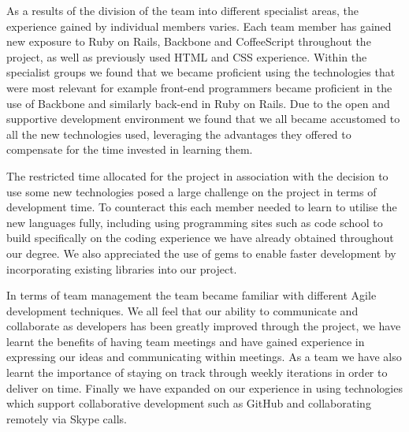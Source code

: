 		As a results of the division of the team into different specialist areas, the experience gained by individual members varies. Each team member has gained new exposure to Ruby on Rails, Backbone and CoffeeScript throughout the project, as well as previously used HTML and CSS experience. Within the specialist groups we found that we became proficient using the technologies that were most relevant for example front-end programmers became proficient in the use of Backbone and similarly back-end in Ruby on Rails. Due to the open and supportive development environment we found that we all became accustomed to all the new technologies used, leveraging the advantages they offered to compensate for the time invested in learning them.

		The restricted time allocated for the project in association with the decision to use some new technologies posed a large challenge on the project in terms of development time. To counteract this each member needed to learn to utilise the new languages fully, including using programming sites such as code school to build specifically on the coding experience we have already obtained throughout our degree. We also appreciated the use of gems to enable faster development by incorporating existing libraries into our project. 

		In terms of team management the team became familiar with different Agile development techniques. We all feel that our ability to communicate and collaborate as developers has been greatly improved through the project, we have learnt the benefits of having team meetings and have gained experience in expressing our ideas and communicating within meetings. As a team we have also learnt the importance of staying on track through weekly iterations in order to deliver on time. Finally we have expanded on our experience in using technologies which support collaborative development such as GitHub and collaborating remotely via Skype calls.
